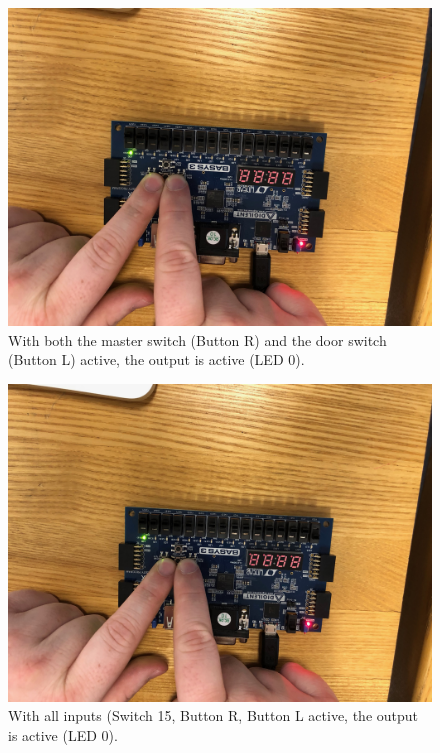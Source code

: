 \documentclass[11pt]{article}
\begin{document}
\begin{figure}[H]
	\includegraphics[width=\textwidth]{report_images/Lab1BoardPictures/Lab1Part2/IMG_0415.jpg}
	\caption{\label{fig:figure-name}With both the master switch (Button R) and the door switch (Button L) active, the output is active (LED 0).}
\end{figure}

\begin{figure}[H]
	\includegraphics[width=\textwidth]{report_images/Lab1BoardPictures/Lab1Part2/IMG_0416.jpg}
	\caption{\label{fig:figure-name}With all inputs (Switch 15, Button R, Button L active, the output is active (LED 0).}
\end{figure}
\end{document}
